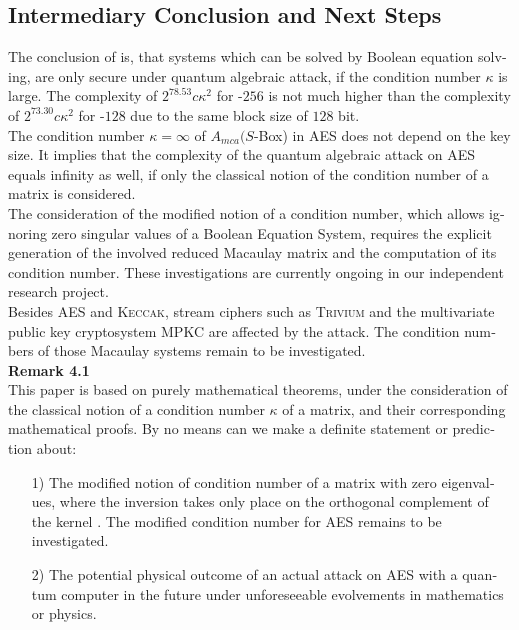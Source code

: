 \documentclass[a4paper,11pt]{article}
\begin{document}
\begin{otherlanguage}{english}
\section{Intermediary Conclusion and Next Steps}

\noindent
The conclusion of \cite{QAA} is, that systems which can be solved by Boolean equation solving, are only secure under quantum algebraic attack, if the condition number $\kappa$ is large. The complexity of $2^{78.53}c\kappa^2$ for -$256$ is not much higher than the complexity of $2^{73.30}c\kappa^2$ for -$128$ due to the same block size of $128$ bit.\\
The condition number $\kappa = \infty$ of $A_{mca}(S$-Box) in \textsc{AES} does not depend on the key size. It implies that the complexity of the quantum algebraic attack on \textsc{AES} equals infinity as well, if only the classical notion of the condition number of a matrix is considered. \\

\noindent
The consideration of the modified notion of a condition number, which allows ignoring zero singular values of a Boolean Equation System, requires the explicit generation of the involved reduced Macaulay matrix and the computation of its condition number. These investigations are currently ongoing in our independent research project. \\

\noindent
Besides \textsc{AES} and \textsc{Keccak}, stream ciphers such as \textsc{Trivium} and the multivariate public key cryptosystem \textsc{MPKC} are affected by the attack. The condition numbers of those Macaulay systems remain to be investigated.\\

\noindent
\textbf{Remark 4.1} \\
This paper is based on purely mathematical theorems, under the consideration of the classical notion of a condition number $\kappa$ of a matrix, and their corresponding mathematical proofs. By no means can we make a definite statement or prediction about: \\

\begin{itemize} [noitemsep, nolistsep]
  \item[1)] The modified notion of condition number of a matrix with zero eigenvalues, where the inversion takes only place on the orthogonal complement of the kernel \cite{SCH}. The modified condition number for \textsc{AES} remains to be investigated.
  \vspace{0.1cm}
  \item[2)] The potential physical outcome of an actual attack on \textsc{AES} with a quantum computer in the future under unforeseeable evolvements in mathematics or physics.\\
  \vspace{0.1cm}
\end{itemize}
\vspace{0.5cm}



\end{otherlanguage}
\end{document}
